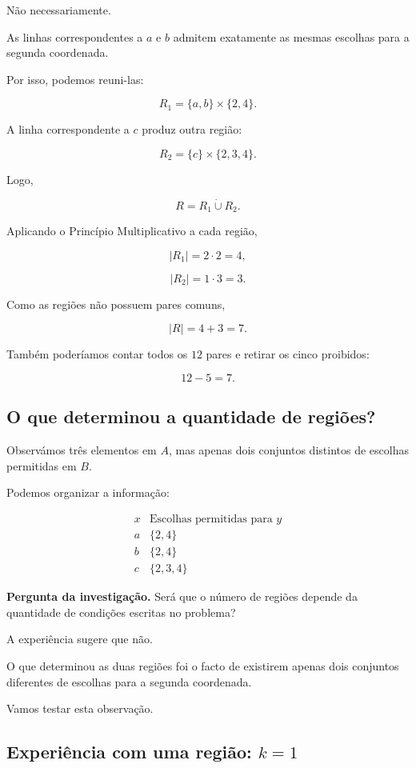 \documentclass[11pt,a4paper,oneside]{book}
\newcommand{\Pergunta}[1]{\begin{perguntabox}\textbf{Pergunta da investigação.} #1\end{perguntabox}}
\newcommand{\card}[1]{\lvert #1\rvert}
\begin{document}
Não necessariamente.

As linhas correspondentes a $a$ e $b$
admitem exatamente as mesmas
escolhas para a segunda coordenada.

Por isso, podemos reuni-las:

\[
R_1=\{a,b\}\times\{2,4\}.
\]

A linha correspondente a $c$
produz outra região:

\[
R_2=\{c\}\times\{2,3,4\}.
\]

Logo,

\[
R=R_1\mathbin{\dot\cup}R_2.
\]

Aplicando o Princípio Multiplicativo
a cada região,

\[
\card{R_1}=2\cdot2=4,
\]

\[
\card{R_2}=1\cdot3=3.
\]

Como as regiões não possuem pares comuns,

\[
\boxed{\card R=4+3=7}.
\]

Também poderíamos contar todos os
$12$ pares e retirar os cinco proibidos:

\[
12-5=7.
\]

\subsection*{O que determinou a quantidade de regiões?}

Observámos três elementos em $A$,
mas apenas dois conjuntos distintos
de escolhas permitidas em $B$.

Podemos organizar a informação:

\[
\begin{array}{c|c}
x&\text{Escolhas permitidas para }y\\
\hline
a&\{2,4\}\\
b&\{2,4\}\\
c&\{2,3,4\}
\end{array}
\]

\Pergunta{Será que o número de regiões
depende da quantidade de condições
escritas no problema?}

A experiência sugere que não.

O que determinou as duas regiões
foi o facto de existirem apenas
dois conjuntos diferentes de escolhas
para a segunda coordenada.

Vamos testar esta observação.

\subsection*{Experiência com uma região: $k=1$}
\end{document}
